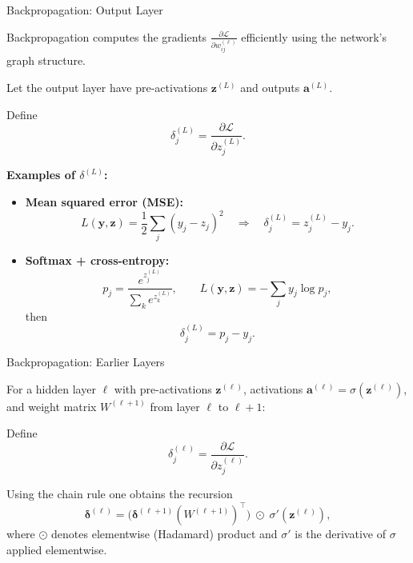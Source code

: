 \documentclass[aspectratio=169]{beamer}
\begin{document}
\begin{frame}{Backpropagation: Output Layer}

Backpropagation computes the gradients
$\frac{\partial \mathcal{L}}{\partial w^{(\ell)}_{ij}}$
efficiently using the network's graph structure.

\medskip

Let the output layer have pre-activations
$\bm{z}^{(L)}$ and outputs $\bm{a}^{(L)}$.

Define
\[
  \delta^{(L)}_j
      = \frac{\partial \mathcal{L}}{\partial z^{(L)}_j}.
\]

\textbf{Examples of $\delta^{(L)}$:}

\begin{itemize}
  \item \textbf{Mean squared error (MSE):}
    \[
      L(\bm{y},\bm{z}) = \frac{1}{2}\sum_j (y_j - z_j)^2
      \quad\Rightarrow\quad
      \delta^{(L)}_j = z^{(L)}_j - y_j.
    \]
  \item \textbf{Softmax + cross-entropy:}
    \[
      p_j = \frac{e^{z^{(L)}_j}}{\sum_k e^{z^{(L)}_k}},\qquad
      L(\bm{y},\bm{z}) = -\sum_j y_j \log p_j,
    \]
    then
    \[
      \delta^{(L)}_j = p_j - y_j.
    \]
\end{itemize}

\end{frame}

\begin{frame}{Backpropagation: Earlier Layers}

For a hidden layer $\ell$ with pre-activations $\bm{z}^{(\ell)}$,
activations $\bm{a}^{(\ell)} = \sigma(\bm{z}^{(\ell)})$, and weight
matrix $W^{(\ell+1)}$ from layer $\ell$ to $\ell+1$:

\medskip

Define
\[
  \delta^{(\ell)}_j
    = \frac{\partial \mathcal{L}}{\partial z^{(\ell)}_j}.
\]

Using the chain rule one obtains the recursion
\[
  \bm{\delta}^{(\ell)}
   = \bigl(\bm{\delta}^{(\ell+1)} (W^{(\ell+1)})^\top\bigr)
      \;\odot\;
      \sigma'\!\left(\bm{z}^{(\ell)}\right),
\]
where $\odot$ denotes elementwise (Hadamard) product and $\sigma'$ is the
derivative of $\sigma$ applied elementwise.

\end{frame}
\end{document}
